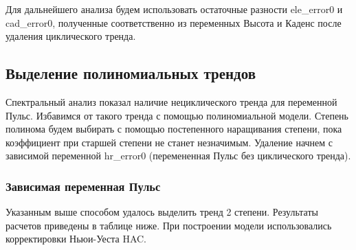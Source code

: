 \documentclass[a4paper,12pt]{article}
\begin{document}
Для дальнейшего анализа будем использовать остаточные разности ele\_error0 и cad\_error0, полученные соответственно из переменных Высота и Каденс после удаления циклического тренда.

\subsection{Выделение полиномиальных трендов}
Спектральный анализ показал наличие нециклического тренда для переменной Пульс. Избавимся от такого тренда с помощью полиномиальной модели. Степень полинома будем выбирать с помощью постепенного наращивания степени, пока коэффициент при старшей степени не станет незначимым. Удаление начнем с зависимой переменной hr\_error0 (перемененная Пульс без циклического тренда).

\subsubsection{Зависимая переменная Пульс}

Указанным выше способом удалось выделить тренд 2 степени. Результаты расчетов приведены в таблице ниже. При построении модели использовались корректировки Ньюи-Уеста HAC.
\end{document}

